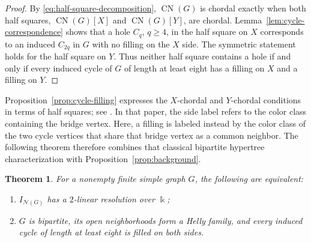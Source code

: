 \documentclass[11pt]{amsart}
\newtheorem{theorem}{Theorem}[section]
\theoremstyle{definition}
\theoremstyle{remark}
\numberwithin{equation}{section}
\newcommand{\NN}{\mathcal N}
\newcommand{\CN}{\operatorname{CN}}
\begin{document}
	\begin{proof}
		By \eqref{eq:half-square-decomposition}, \(\CN(G)\) is chordal exactly when
		both half squares, \(\CN(G)[X]\) and \(\CN(G)[Y]\), are chordal.
		Lemma~\ref{lem:cycle-correspondence} shows that a hole \(C_q\), \(q\ge4\),
		in the half square on \(X\) corresponds to an induced \(C_{2q}\) in \(G\) with
		no filling on the \(X\) side. The symmetric statement holds for the half
		square on \(Y\). Thus neither half square contains a hole if and only if every
		induced cycle of
		\(G\) of length at least eight has a filling on \(X\) and a filling on
		\(Y\).
	\end{proof}
	
	Proposition~\ref{prop:cycle-filling} expresses the \(X\)-chordal and
	\(Y\)-chordal conditions in terms of half squares; see
	\cite[Theorems~6--7]{BrandstadtDraganChepoiVoloshin1998}. In that paper,
	the side label refers to the color class containing the bridge
	vertex. Here,
	a filling is labeled instead by the color class of the two cycle vertices that
	share that bridge vertex as a common neighbor. The following theorem therefore
	combines that classical bipartite hypertree characterization with
	Proposition~\ref{prop:background}.
	
	\begin{theorem}\label{thm:structural}
		For a nonempty finite simple graph \(G\), the following are equivalent:
		\begin{enumerate}[label=\textup{(\roman*)}]
			\item \(I_{\NN(G)}\) has a \(2\)-linear resolution over \(\Bbbk\);
			\item \(G\) is bipartite, its open neighborhoods form a Helly family, and
			every induced cycle of length at least eight is filled on both sides.
		\end{enumerate}
	\end{theorem}
	
\end{document}
